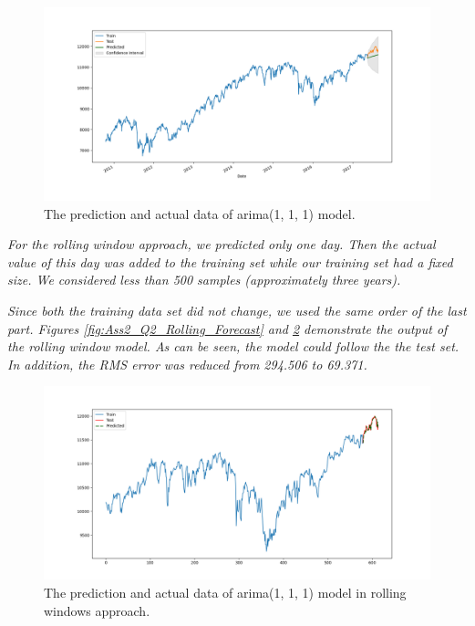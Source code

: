 \begin{figure}[H]
    \centering
    \begin{minipage}[b]{1\textwidth}
        \includegraphics[width=\textwidth]{manuscript/src/figures/Ass2/Ass2_Q2_Automatic_model_forcasting.png}
    \end{minipage}
    \caption{The prediction and actual data of \gls{arima}(1, 1, 1) model.}
    \label{fig:Ass2_Q2_Automatic_model_forcasting}
\end{figure}


\textit{For the rolling window approach, we predicted only one day. Then the actual value of this day was added to the training set while our training set had a fixed size. We considered less than 500 samples (approximately three years).}

\textit{Since both the training data set did not change, we used the same order of the last part. Figures \ref{fig:Ass2_Q2_Rolling_Forecast} and \ref{fig:Ass2_Q2_Rolling_Forecast_1} demonstrate the output of the rolling window model. As can be seen, the model could follow the the test set. In addition, the RMS error was reduced from 294.506 to 69.371.}

\begin{figure}[H]
    \centering
    \begin{minipage}[b]{1\textwidth}
        \includegraphics[width=\textwidth]{manuscript/src/figures/Ass2/Ass2_Q2_Rolling_Forecast_1.png}
    \end{minipage}
    \caption{The prediction and actual data of \gls{arima}(1, 1, 1) model in rolling windows approach.}
    \label{fig:Ass2_Q2_Rolling_Forecast_1}
\end{figure}


